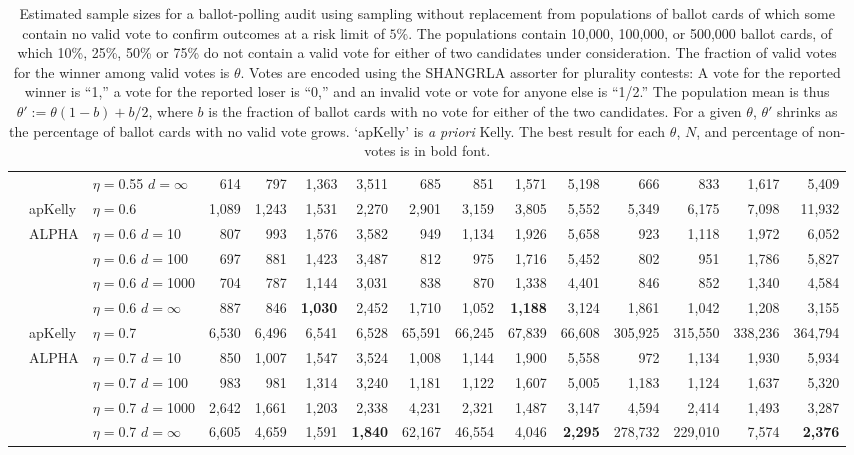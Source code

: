 \documentclass[12pt,runningheads]{llncs}
\begin{document}
{\begin{table}
\begin{tabular}{lll|rrrr|rrrr|rrrr}
 &  & $\eta=$0.55 $d=\infty$ & 614  & 797  & 1,363  & 3,511  & 685  & 851  & 1,571  & 5,198  & 666  & 833  & 1,617  & 5,409  \\
\cline{2-15} & apKelly & $\eta=$0.6 & 1,089  & 1,243  & 1,531  & 2,270  & 2,901  & 3,159  & 3,805  & 5,552  & 5,349  & 6,175  & 7,098  & 11,932  \\
\cline{2-15}
& ALPHA & $\eta=$0.6 $d=$10 & 807  & 993  & 1,576  & 3,582  & 949  & 1,134  & 1,926  & 5,658  & 923  & 1,118  & 1,972  & 6,052  \\
&  & $\eta=$0.6 $d=$100 & 697  & 881  & 1,423  & 3,487  & 812  & 975  & 1,716  & 5,452  & 802  & 951  & 1,786  & 5,827  \\
&  & $\eta=$0.6 $d=$1000 & 704  & 787  & 1,144  & 3,031  & 838  & 870  & 1,338  & 4,401  & 846  & 852  & 1,340  & 4,584  \\
 &  & $\eta=$0.6 $d=\infty$ & 887  & 846  & \bf{1,030}  & 2,452  & 1,710  & 1,052  & \bf{1,188}  & 3,124  & 1,861  & 1,042  & 1,208  & 3,155  \\
\cline{2-15} & apKelly & $\eta=$0.7 & 6,530  & 6,496  & 6,541  & 6,528  & 65,591  & 66,245  & 67,839  & 66,608  & 305,925  & 315,550  & 338,236  & 364,794  \\
\cline{2-15}
& ALPHA & $\eta=$0.7 $d=$10 & 850  & 1,007  & 1,547  & 3,524  & 1,008  & 1,144  & 1,900  & 5,558  & 972  & 1,134  & 1,930  & 5,934  \\
&  & $\eta=$0.7 $d=$100 & 983  & 981  & 1,314  & 3,240  & 1,181  & 1,122  & 1,607  & 5,005  & 1,183  & 1,124  & 1,637  & 5,320  \\
&  & $\eta=$0.7 $d=$1000 & 2,642  & 1,661  & 1,203  & 2,338  & 4,231  & 2,321  & 1,487  & 3,147  & 4,594  & 2,414  & 1,493  & 3,287  \\
 &  & $\eta=$0.7 $d=\infty$ & 6,605  & 4,659  & 1,591  & \bf{1,840}  & 62,167  & 46,554  & 4,046  & \bf{2,295}  & 278,732  & 229,010  & 7,574  & \bf{2,376} 
\end{tabular} 
\caption{\protect \label{tab:without-replacement-blanks-1}
Estimated sample sizes for a ballot-polling audit using sampling without replacement from populations of ballot cards of which
some contain no valid vote to confirm outcomes at a risk limit of $5\%$.
The populations contain 10,000, 100,000, or 500,000 ballot cards, of which 10\%, 25\%, 50\% or 75\% do not
contain a valid vote for either of two candidates under consideration.
The fraction of valid votes for the winner among valid votes is $\theta$. 
Votes are encoded using the SHANGRLA assorter for plurality contests:
A vote for the reported winner is ``1,'' a vote for the reported loser is ``0,'' and an invalid vote or vote for anyone else is ``1/2.''
The population mean is thus $\theta' := \theta(1-b) + b/2$, where $b$ is the fraction of ballot cards with no
vote for either of the two candidates.
For a given $\theta$, $\theta'$ shrinks as the percentage of ballot cards with no valid vote grows.
`apKelly' is \emph{a priori} Kelly.
The best result for each $\theta$, $N$, and percentage of non-votes is in bold font.
}
\end{table}

}
\end{document}
